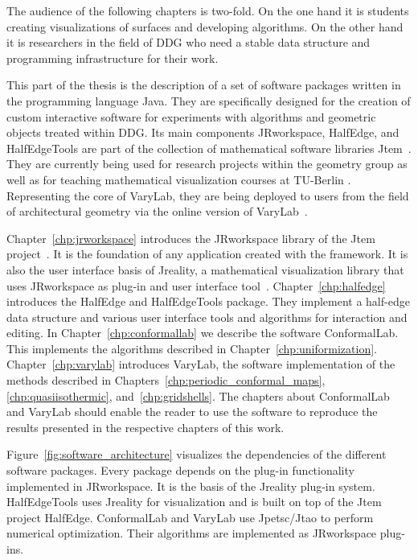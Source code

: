 \documentclass[Thesis.tex]{subfiles}
\begin{document}
The audience of the following chapters is two-fold. On the one hand it is students creating 
visualizations of surfaces and developing algorithms. On the other hand it is researchers in the
field of DDG who need a stable data structure and programming
infrastructure for their work.

This part of the thesis is the description of a set of software packages
written in the programming language {\sc Java}. They are 
specifically designed for the creation of custom interactive software for experiments with algorithms and geometric objects treated within DDG. 
Its main components {\sc JRworkspace}, {\sc HalfEdge}, and {\sc HalfEdgeTools} are part of the collection of mathematical software libraries {\sc Jtem}~\cite{JtemWebsite}.
They are currently being used for research projects within the geometry group as well as for teaching mathematical visualization courses at TU-Berlin \cite{VisMathHomepage}.
Representing the core of {\sc VaryLab}, they are being deployed to users from the field of architectural geometry via the online version of {\sc VaryLab}~\cite{varylab-web-page}.

Chapter~\ref{chp:jrworkspace} introduces the {\sc JRworkspace} library of the 
{\sc Jtem} project~\cite{JtemWebsite}. It is the foundation of any application created with 
the framework. It is also the user interface basis of {\sc Jreality}, a mathematical 
visualization library that uses {\sc JRworkspace} as plug-in and user interface 
tool~\cite{JrealityWebsite}. Chapter~\ref{chp:halfedge} introduces the 
{\sc HalfEdge} and {\sc HalfEdgeTools} package. They implement a half-edge data 
structure and various user interface tools and algorithms for interaction and editing.  
In Chapter~\ref{chp:conformallab} we describe the software 
{\sc ConformalLab}. This implements the algorithms described in Chapter~\ref{chp:uniformization}.
Chapter~\ref{chp:varylab} introduces {\sc VaryLab}, the software implementation of the 
methods described in Chapters~\ref{chp:periodic_conformal_maps}, \ref{chp:quasiisothermic}, and~\ref{chp:gridshells}.
The chapters about {\sc ConformalLab} and {\sc VaryLab} should enable the reader to use the  software to reproduce the results presented in the respective chapters of this work.

Figure~\ref{fig:software_architecture} visualizes the dependencies of the different software packages.
Every package depends on the plug-in functionality implemented in {\sc JRworkspace}. 
It is the basis of the {\sc Jreality} plug-in system. 
{\sc Half\-Edge\-Tools} uses {\sc Jreality} for visualization and is built on top of the {\sc Jtem} project {\sc Half\-Edge}. 
{\sc ConformalLab} and {\sc VaryLab} use {\sc Jpetsc/Jtao} to perform numerical
optimization. Their algorithms are implemented as {\sc JRworkspace} plug-ins.
\end{document}
